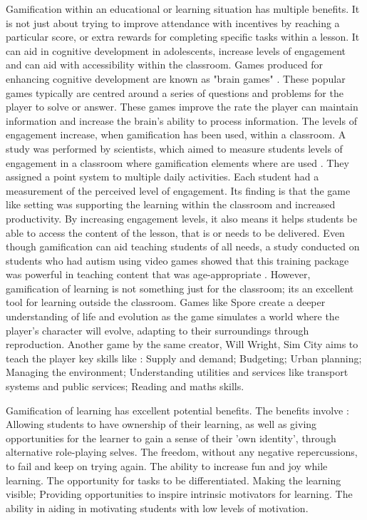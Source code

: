 		Gamification within an educational or learning situation has multiple benefits. It is not just about trying to improve attendance with incentives by reaching a particular score, or extra rewards for completing specific tasks within a lesson. It can aid in cognitive development in adolescents, increase levels of engagement and can aid with accessibility within the classroom. Games produced for enhancing cognitive development are known as "brain games" \cite{5benefits}. These popular games typically are centred around a series of questions and problems for the player to solve or answer. These games improve the rate the player can maintain information and increase the brain's ability to process information. The levels of engagement increase, when gamification has been used, within a classroom. A study was performed by scientists, which aimed to measure students levels of engagement in a classroom where gamification elements where are used \cite{eduengage}. They assigned a point system to multiple daily activities. Each student had a measurement of the perceived level of engagement. Its finding is that the game like setting was supporting the learning within the classroom and increased productivity. By increasing engagement levels, it also means it helps students be able to access the content of the lesson, that is or needs to be delivered. Even though gamification can aid teaching students of all needs, a study conducted on students who had autism using video games showed that this training package was powerful in teaching content that was age-appropriate \cite{autismedu}. However, gamification of learning is not something just for the classroom; its an excellent tool for learning outside the classroom. Games like Spore create a deeper understanding of life and evolution as the game simulates a world where the player's character will evolve, adapting to their surroundings through reproduction. Another game by the same creator, Will Wright, Sim City aims to teach the player key skills like \cite{simfact}: Supply and demand; Budgeting; Urban planning; Managing the environment; Understanding utilities and services like transport systems and public services; Reading and maths skills.

		Gamification of learning has excellent potential benefits. The benefits involve \cite{gamelearning}: Allowing students to have ownership of their learning, as well as giving opportunities for the learner to gain a sense of their 'own identity', through alternative role-playing selves. The freedom, without any negative repercussions, to fail and keep on trying again. The ability to increase fun and joy while learning. The opportunity for tasks to be differentiated. Making the learning visible; Providing opportunities to inspire intrinsic motivators for learning. The ability in aiding in motivating students with low levels of motivation.
		
		